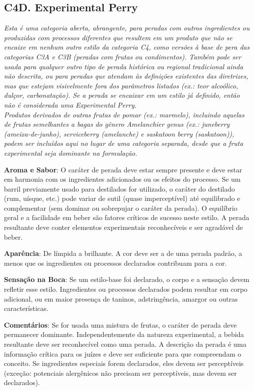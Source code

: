 \subsection*{C4D. Experimental Perry}

\textit{Esta é uma categoria aberta, abrangente, para peradas com outros ingredientes ou produzidas com processos diferentes que resultem em um produto que não se encaixe em nenhum outro estilo da categoria C4, como versões à base de pera das categorias C3A e C3B (peradas com frutas ou condimentos). Também pode ser usada para qualquer outro tipo de perada histórica ou regional tradicional ainda não descrita, ou para peradas que atendam às definições existentes das diretrizes, mas que estejam visivelmente fora dos parâmetros listados (ex.: teor alcoólico, dulçor, carbonatação). Se a perada se encaixar em um estilo já definido, então não é considerada uma Experimental Perry.} \\
\textit{Produtos derivados de outras frutas de pomar (ex.: marmelo), incluindo aquelas de frutas semelhantes a bagas do gênero \textit{Amelanchier genus} (ex.: juneberry (ameixa-de-junho), serviceberry (amelanche) e saskatoon berry (saskatoon)), podem ser incluídos aqui no lugar de uma categoria separada, desde que a fruta experimental seja dominante na formulação.}

\textbf{Aroma e Sabor}: O caráter de perada deve estar sempre presente e deve estar em harmonia com os ingredientes adicionados ou os efeitos do processo. Se um barril previamente usado para destilados for utilizado, o caráter do destilado (rum, uísque, etc.) pode variar de sutil (quase imperceptível) até equilibrado e complementar (sem dominar ou sobrepujar o caráter da perada). O equilíbrio geral e a facilidade em beber são fatores críticos de sucesso neste estilo. A perada resultante deve conter elementos experimentais reconhecíveis e ser agradável de beber.

\textbf{Aparência}: De límpida a brilhante. A cor deve ser a de uma perada padrão, a menos que os ingredientes ou processos declarados contribuam para a cor.

\textbf{Sensação na Boca}: Se um estilo-base foi declarado, o corpo e a sensação devem refletir esse estilo. Ingredientes ou processos declarados podem resultar em corpo adicional, ou em maior presença de taninos, adstringência, amargor ou outras características.

\textbf{Comentários}: Se for usada uma mistura de frutas, o caráter de perada deve permanecer dominante. Independentemente da natureza experimental, a bebida resultante deve ser reconhecível como uma perada. A descrição da perada é uma informação crítica para os juízes e deve ser suficiente para que compreendam o conceito. Se ingredientes especiais forem declarados, eles devem ser perceptíveis (exceção: potenciais alergênicos não precisam ser perceptíveis, mas devem ser declarados).

